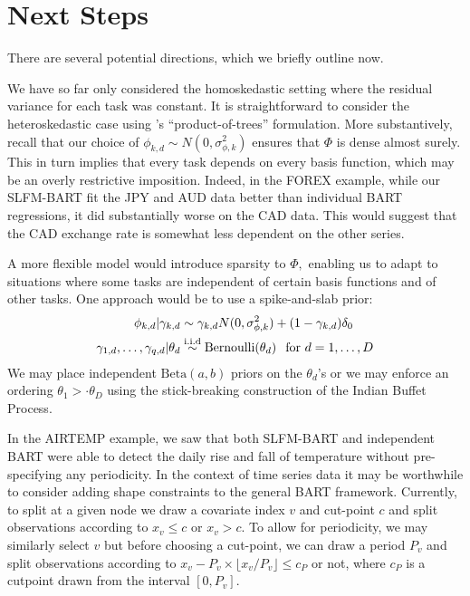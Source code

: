 \documentclass[12pt]{article}
\begin{document}
\section{Next Steps}

There are several potential directions, which we briefly outline now.

We have so far only considered the homoskedastic setting where the residual variance for each task was constant.
It is straightforward to consider the heteroskedastic case using \citet{Pratola2016}'s ``product-of-trees'' formulation.
More substantively, recall that our choice of $\phi_{k,d} \sim N(0,\sigma^{2}_{\phi,k})$ ensures that $\Phi$ is dense almost surely.
This in turn implies that every task depends on every basis function, which may be an overly restrictive imposition.
Indeed, in the FOREX example, while our SLFM-BART fit the JPY and AUD data better than individual BART regressions, it did substantially worse on the CAD data.
This would suggest that the CAD exchange rate is somewhat less dependent on the other series.

A more flexible model would introduce sparsity to $\Phi,$ enabling us to adapt to situations where some tasks are independent of certain basis functions and of other tasks.
One approach would be to use a spike-and-slab prior: 
\begin{align*}
\phi_{k,d} | \gamma_{k,d} &\sim \gamma_{k,d}N(0,\sigma^{2}_{\phi,k}) + (1 - \gamma_{k,d})\delta_{0} \\
\gamma_{1,d}, \ldots, \gamma_{q,d} | \theta_{d} &\stackrel{\text{i.i.d}}{\sim} \text{Bernoulli}(\theta_{d}) \hspace{0.1in} \text{for $d = 1, \ldots, D$} %
\end{align*}
We may place independent $\text{Beta}(a,b)$ priors on the $\theta_{d}$'s or we may enforce an ordering $\theta_{1} > \cdot \theta_{D}$ using the stick-breaking construction of the Indian Buffet Process.

In the AIRTEMP example, we saw that both SLFM-BART and independent BART were able to detect the daily rise and fall of temperature without pre-specifying any periodicity.
In the context of time series data it may be worthwhile to consider adding shape constraints to the general BART framework.
Currently, to split at a given node we draw a covariate index $v$ and cut-point $c$ and split observations according to $x_{v} \leq c$ or $x_{v} > c.$
To allow for periodicity, we may similarly select $v$ but before choosing a cut-point, we can draw a period $P_{v}$ and split observations according to $x_{v} - P_{v}\times \lfloor x_{v}/P_{v} \rfloor \leq c_{P}$ or not, where $c_{P}$ is a cutpoint drawn from the interval $[0,P_{v}].$ 
\end{document}
